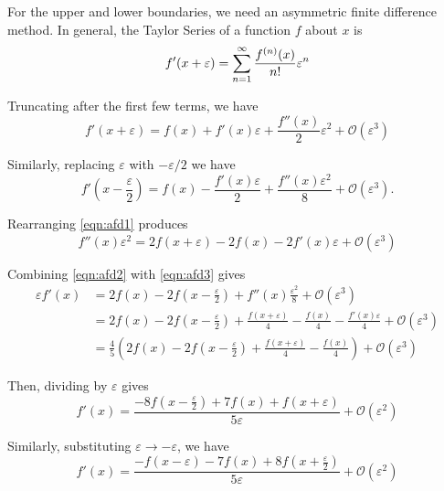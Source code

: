 \documentclass[ms,cpyr,lof,lot]{uathesis}
\begin{document}
For the upper and lower boundaries, we need an asymmetric finite difference
method.
In general, the Taylor Series of a function $f$ about $x$ is
\begin{equation*}
  f'(x+\varepsilon) = \sum_{n=1}^\infty \frac{f^{(n)}(x)}{n!} \varepsilon^n \\
\end{equation*}

Truncating after the first few terms, we have
\begin{equation}
  \label{eqn:afd1}
  f'(x+\varepsilon)  = f(x) + f'(x)\varepsilon + \frac{f''(x)}{2}\varepsilon^2 + \mathcal{O}(\varepsilon^3)
\end{equation}

Similarly, replacing $\varepsilon$ with $-\varepsilon/2$ we have
\begin{equation}
  \label{eqn:afd2}
  f'(x-\frac{\varepsilon}{2}) = f(x) - \frac{f'(x)\varepsilon}{2} + \frac{f''(x)\varepsilon^2}{8} + \mathcal{O}(\varepsilon^3).
\end{equation}

Rearranging \eqref{eqn:afd1} produces
\begin{equation}
  \label{eqn:afd3}
  f''(x)\varepsilon^2 = 2f(x+\varepsilon) - 2f(x) - 2f'(x)\varepsilon + \mathcal{O}(\varepsilon^3)
\end{equation}

Combining \eqref{eqn:afd2} with \eqref{eqn:afd3} gives
\begin{align*}
  \varepsilon f'(x) &= 2f(x) - 2f(x-\frac{\varepsilon}{2}) + f''(x)\frac{\varepsilon^2}{8} + \mathcal{O}(\varepsilon^3) \\
                    &= 2f(x) - 2f(x-\frac{\varepsilon}{2}) + \frac{f(x+\varepsilon)}{4} - \frac{f(x)}{4} - \frac{f'(x)\varepsilon}{4} + \mathcal{O}(\varepsilon^3) \\
                    &= \frac{4}{5}\left( 2f(x)-2f(x-\frac{\varepsilon}{2}) + \frac{f(x+\varepsilon)}{4} - \frac{f(x)}{4} \right) + \mathcal{O}(\varepsilon^3)
\end{align*}

Then, dividing by $\varepsilon$ gives
\begin{equation*}
  f'(x) = \frac{-8f(x-\frac{\varepsilon}{2}) + 7f(x) + f(x+\varepsilon)}{5\varepsilon} + \mathcal{O}(\varepsilon^2)
\end{equation*}

Similarly, substituting $\varepsilon \to -\varepsilon$, we have 
\begin{equation*}
  f'(x) = \frac{- f(x-\varepsilon) - 7f(x) + 8f(x+\frac{\varepsilon}{2})}{5\varepsilon} + \mathcal{O}(\varepsilon^2)
\end{equation*}
\end{document}
